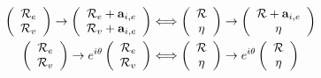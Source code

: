 \begin{align}
\left(\begin{array}{c}
    \mathcal R_e \\
    \mathcal R_v
\end{array}\right)\rightarrow \left(\begin{array}{c}
    \mathcal R_e+\mathbf a_{i,e} \\
    \mathcal R_v+\mathbf a_{i,e}
\end{array}\right)&\Longleftrightarrow\left(\begin{array}{c}
    \mathcal R \\
    \eta
\end{array}\right)\rightarrow\left(\begin{array}{c}
    \mathcal R+\mathbf a_{i,e} \\
    \eta
\end{array}\right)\notag\\
\left(\begin{array}{c}
    \mathcal R_e \\
    \mathcal R_v
\end{array}\right)\rightarrow e^{i\theta}\left(\begin{array}{c}
    \mathcal R_e \\
    \mathcal R_v
\end{array}\right)&\Longleftrightarrow\left(\begin{array}{c}
    \mathcal R \\
    \eta
\end{array}\right)\rightarrow e^{i\theta}\left(\begin{array}{c}
    \mathcal R \\
    \eta
\end{array}\right)\label{eq:proj_symm}
\end{align}



